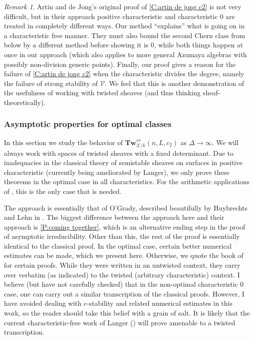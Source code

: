 \documentclass[11pt]{amsart}
\newcommand{\ms}[1]{\mathscr #1}
\renewcommand{\[}{[\!\hspace{0.03em}[}
\renewcommand{\]}{]\!\hspace{0.03em}]}
\renewcommand{\(}{(\!\hspace{0.03em}(}
\renewcommand{\)}{)\!\hspace{0.03em})}
\newcommand{\Tw}{\mathbf{Tw}}
\theoremstyle{definition}
\theoremstyle{remark}
\newtheorem{remark}[lem]{Remark}
\newenvironment{rem}{\begin{remark}}{\nolinebreak{\hfill $\blacklozenge$} \end{remark}}
\begin{document}
\begin{rem} Artin and de Jong's original proof of \ref{C:artin de jong c2} is not 
very difficult, but in their approach positive characteristic and 
characteristic 0 are treated in completely different ways.   
Our method ``explains'' what is going on in a characteristic free manner.
They must also bound the second Chern class from below by a different 
method before showing it is 0,  
while both things happen at once in our approach (which also applies 
to more general Azumaya algebras with possibly non-division generic 
points).  Finally, our proof 
gives a reason for the failure of \ref{C:artin de jong c2} when the 
characteristic divides the degree, namely the failure of 
strong stability of $\ms V$.  We feel that this is 
another demonstration of the usefulness of working with twisted 
sheaves (and thus thinking sheaf-theoretically).
\end{rem}

\subsubsection{Asymptotic properties for optimal classes}\label{S:asymptotic properties}
In this section we study the behavior of $\Tw^{ss}_{\ms 
X/k}(n,L,c_{2})$ as $\Delta\to\infty$.  We will always work with 
spaces of twisted sheaves with a fixed determinant.  Due to 
inadequacies in the classical theory of semistable sheaves on 
surfaces 
in positive characteristic (currently being ameliorated by Langer), we 
only prove these theorems in the optimal case in all 
characteristics.  For the arithmetic applications of 
\cite{period-index-paper}, this is the only case that is needed.

The approach is essentially that of O'Grady, described beautifully by 
Huybrechts and Lehn in \cite[Chapter 9]{h-l}.  The biggest difference between the 
approach here and their approach is \ref{P:coming together}, which is 
an alternative ending step in the proof of asymptotic irreducibility.  
Other than this, the rest of the proof is essentially identical to the 
classical proof.  In the optimal case, certain better numerical 
estimates can be made, which we present here.  Otherwise, we quote 
the book of \cite{h-l} for certain proofs.  While they were written in an 
untwisted context, they carry over verbatim (as indicated) to the 
twisted (arbitrary characteristic) context.  I believe (but have not 
carefully checked) that in the non-optimal characteristic 0 case, one can carry 
out a similar transcription of the classical proofs.  However, I have 
avoided dealing with $e$-stability and related numerical estimates in 
this work, so the reader should take this belief with a grain of 
salt.  It is likely that the current characteristic-free work of Langer 
(\cite{langer-castelnuovo}) will prove amenable to a twisted transcription.
\end{document}
